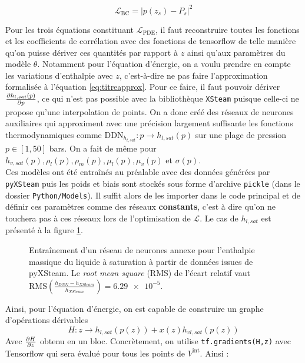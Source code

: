 \begin{equation}
    \mathcal{L}_{\text{BC}} = \left| p(z_s) - P_s\right|^2
\end{equation}

Pour les trois équations constituant $\mathcal{L}_{\text{PDE}}$, il faut reconstruire toutes les fonctions et les coefficients de corrélation avec des fonctions de tensorflow de telle manière qu'on puisse dériver ces quantités par rapport à $z$ ainsi qu'aux paramètres du modèle $\theta$. Notamment pour l'équation d'énergie, on a voulu prendre en compte les variations d'enthalpie avec $z$, c'est-à-dire ne pas faire l'approximation formalisée à l'équation \ref{eq:titreapprox}. Pour ce faire, il faut pouvoir dériver $\pder[h_{l,sat}(p)]{p}$, ce qui n'est pas possible avec la bibliothèque \verb|XSteam| puisque celle-ci ne propose qu'une interpolation de points. On a donc créé des réseaux de neurones auxiliaires qui approximent avec une précision largement suffisante les fonctions thermodynamiques comme $\text{DDN}_{h_{l,sat}} : p \rightarrow h_{l,sat}(p)$ sur une plage de pression $p \in[1, 50]$ bars. On a fait de même pour $h_{v,sat}(p),\rho_l(p),\rho_m(p),\mu_l(p),\mu_v(p)$ et $\sigma(p)$.\\

Ces modèles ont été entraînés au préalable avec des données générées par \verb|pyXSteam| puis les poids et biais sont stockés sous forme d'archive \verb|pickle| (dans le dossier \verb|Python/Models|). Il suffit alors de les importer dans le code principal et de définir ces paramètres comme des réseaux \textbf{constants}, c'est à dire qu'on ne touchera pas à ces réseaux lors de l'optimisation de $\mathcal{L}$. Le cas de $h_{l,sat}$ est présenté à la figure \ref{fig:DNN_enthalpy}.\\

\begin{figure}
    \centering
    \resizebox{0.6\linewidth}{!}{}
    \caption{Entraînement d'un réseau de neurones annexe pour l'enthalpie massique du liquide à saturation à partir de données issues de pyXSteam. Le \textit{root mean square} (RMS) de l'écart relatif vaut $ \text{RMS}\left(\frac{h_{DNN}-h_{XSteam}}{h_{XSteam}}\right)  = \num{6.29e-5}$.}
    \label{fig:DNN_enthalpy}
\end{figure}

Ainsi, pour l'équation d'énergie, on est capable de construire un graphe d'opérations dérivables 
\begin{equation}
    H : z \rightarrow h_{l,sat}(p(z)) + x(z)h_{vl,sat}(p(z))
\end{equation}
Avec $\pder[H]{z}$ obtenu en un bloc. Concrètement, on utilise \verb|tf.gradients(H,z)| avec Tensorflow qui sera évalué pour tous les points de $V^{\text{int}}$. Ainsi :

